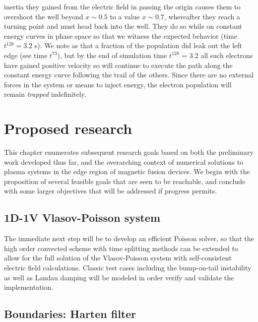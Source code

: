 \documentclass[11pt,titlepage]{report}
\begin{document}
inertia they gained from the electric field in passing the origin causes them to overshoot the well beyond $x \sim 0.5$ to a value $x \sim 0.7$, whereafter they reach a turning point and must head back into the well. They do so while on constant energy curves in phase space so that we witness the expected behavior (time $t^{128} = 3.2$ s). We note as that a fraction of the population did leak out the left edge (see time $t^{73}$), but by the end of simulation time $t^{128}$ = 3.2 all such electrons have gained positive velocity so will continue to execute the path along the constant energy curve following the trail of the others. Since there are no external forces in the system or means to inject energy, the electron population will remain \emph{trapped} indefinitely.
 



\chapter{Proposed research}\label{chap:Future_work}

\indent\indent This chapter enumerates subsequent research goals based on both the preliminary work developed thus far, and the overarching context of numerical solutions to plasma systems in the edge region of magnetic fusion devices. We begin with the proposition of several feasible goals that are seen to be reachable, and conclude with some larger objectives that will be addressed if progress permits.

\newpage

\section{1D-1V Vlasov-Poisson system}

\indent\indent The immediate next step will be to develop an efficient Poisson solver, so that the high order convected scheme with time splitting methods can be extended to allow for the full solution of the Vlasov-Poisson system with self-consistent electric field calculations. Classic test cases including the bump-on-tail instability as well as Landau damping will be modeled in order verify and validate the implementation.

\section{Boundaries: Harten filter}
\end{document}
